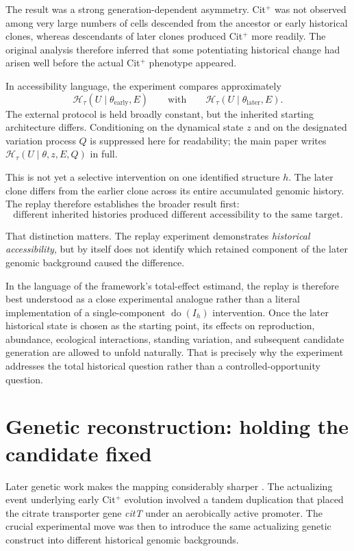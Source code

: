 \documentclass[11pt]{article}
\begin{document}
The result was a strong generation-dependent asymmetry. Cit$^{+}$ was not observed among very large numbers of cells descended from the ancestor or early historical clones, whereas descendants of later clones produced Cit$^{+}$ more readily. The original analysis therefore inferred that some potentiating historical change had arisen well before the actual Cit$^{+}$ phenotype appeared.

In accessibility language, the experiment compares approximately
\[
\mathcal H_{\tau}(U\mid\theta_{\mathrm{early}},E)
\qquad\text{with}\qquad
\mathcal H_{\tau}(U\mid\theta_{\mathrm{later}},E).
\]
The external protocol is held broadly constant, but the inherited starting architecture differs. Conditioning on the dynamical state $z$ and on the designated variation process $Q$ is suppressed here for readability; the main paper writes $\mathcal H_\tau(U\mid\theta,z,E,Q)$ in full.

This is not yet a selective intervention on one identified structure $h$. The later clone differs from the earlier clone across its entire accumulated genomic history. The replay therefore establishes the broader result first:
\[
\boxed{\text{different inherited histories produced different accessibility to the same target}.}
\]

That distinction matters. The replay experiment demonstrates \emph{historical accessibility}, but by itself does not identify which retained component of the later genomic background caused the difference.

In the language of the framework's total-effect estimand, the replay is therefore best understood as a close experimental analogue rather than a literal implementation of a single-component $\operatorname{do}(I_h)$ intervention. Once the later historical state is chosen as the starting point, its effects on reproduction, abundance, ecological interactions, standing variation, and subsequent candidate generation are allowed to unfold naturally. That is precisely why the experiment addresses the total historical question rather than a controlled-opportunity question.

\section{Genetic reconstruction: holding the candidate fixed}

Later genetic work makes the mapping considerably sharper \cite{Blount2012}. The actualizing event underlying early Cit$^{+}$ evolution involved a tandem duplication that placed the citrate transporter gene \emph{citT} under an aerobically active promoter. The crucial experimental move was then to introduce the same actualizing genetic construct into different historical genomic backgrounds.
\end{document}
